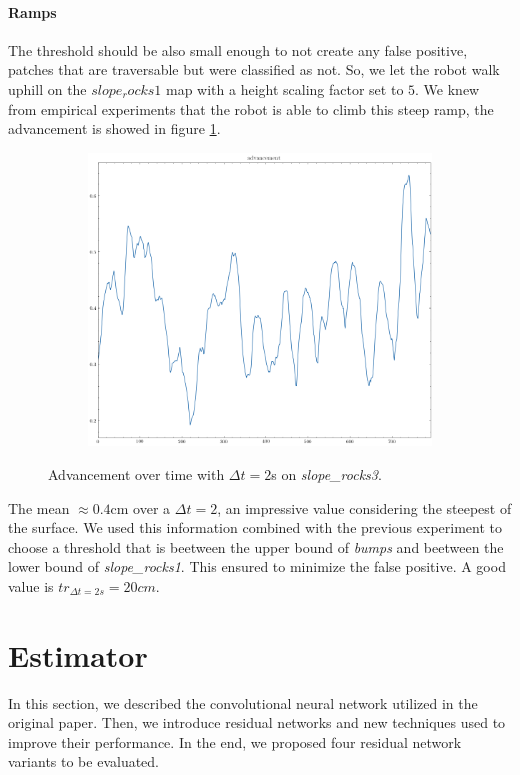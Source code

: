 \documentclass[../document.tex]{subfiles}
\begin{document}
    \paragraph{Ramps}
    The threshold should be also small enough to not create any false positive, patches that are traversable but were classified as not. So, we let the robot walk uphill on the $slope_rocks1$ map with a height scaling factor set to $5$. We knew from empirical experiments that the robot is able to climb this steep ramp, the advancement is showed in figure \ref{fig : krock-ramps-sim}.
    \begin{figure}[htbp]
        \centering
        \begin{subfigure}[b]{0.45\textwidth}
            \includegraphics[width=\linewidth]{../img/3/find_tr/100-slope_rocks1}
        \end{subfigure}
        \caption{Advancement over time with $\Delta t = 2$s on \emph{slope\_rocks3}.}
        \label{fig : krock-ramps-sim}
    \end{figure}
    The mean $\approx 0.4$cm over a $\Delta t =2$, an impressive value considering the steepest of the surface. We used this information combined with the previous experiment to choose a threshold that is beetween the upper bound of \emph{bumps} and beetween the lower bound of \emph{slope\_rocks1}. This ensured to minimize the false positive. A good value is $tr_{\Delta t = 2s} = 20cm$. 


\section{Estimator}
\label{sec: estimator}
In this section, we described the convolutional neural network utilized in the original paper. Then, we introduce residual networks and new techniques used to improve their performance. In the end, we proposed four residual network variants to be evaluated.
\end{document}
